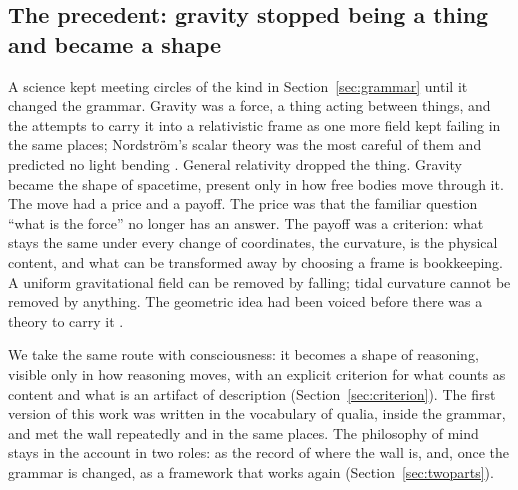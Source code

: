 \subsection{The precedent: gravity stopped being a thing and became a shape}
\label{sec:precedent}

A science kept meeting circles of the kind in Section~\ref{sec:grammar} until it changed the grammar.
Gravity was a force, a thing acting between things, and the attempts to carry it into a relativistic
frame as one more field kept failing in the same places; Nordström's scalar theory was the most careful
of them and predicted no light bending \citep{norton1992}. General relativity dropped the thing. Gravity
became the shape of spacetime, present only in how free bodies move through it. The move had a price
and a payoff. The price was that the familiar question ``what is the force'' no longer has an answer.
The payoff was a criterion: what stays the same under every change of coordinates, the curvature, is
the physical content, and what can be transformed away by choosing a frame is bookkeeping. A uniform
gravitational field can be removed by falling; tidal curvature cannot be removed by anything. The
geometric idea had been voiced before there was a theory to carry it \citep{riemann1873,clifford1876}.

We take the same route with consciousness: it becomes a shape of reasoning, visible only in how
reasoning moves, with an explicit criterion for what counts as content and what is an artifact of
description (Section~\ref{sec:criterion}). The first version of this work was written in the
vocabulary of qualia, inside the grammar, and met the wall repeatedly and in the same places. The
philosophy of mind stays in the account in two roles: as the record of where the wall is, and, once
the grammar is changed, as a framework that works again (Section~\ref{sec:twoparts}).
